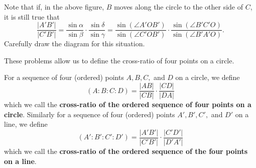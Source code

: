 \documentclass[newpage,hints,handout]{ximera}
\begin{document}



\begin{problem}
Note that if, in the above figure, $B$ moves along the
circle to the other side of $C$, it is still true that%
\[
\frac{\left|A'B'\right|}{\left|C'B'\right|}=
\frac{\sin\alpha}{\sin\beta}\cdot\frac{\sin\delta}{\sin\gamma}=
\frac{\sin\left(\angle A'OB'\right)}{\sin\left(\angle C'OB'\right)}\cdot\frac{
\sin\left( \angle B'C'O\right)}{\sin\left(\angle B'A'O\right)}.
\]
Carefully draw the diagram for this situation.
\end{problem}

These problems allow us to define the cross-ratio of four points on a
circle.

\begin{definition}
For a sequence of four (ordered) points $A,B,C,$ and $D$ on a circle,
we define%
\[
\left(A:B:C:D\right)=
\frac{\left| AB\right|}{\left|CB\right|}\cdot
\frac{
\left|CD\right|
}{
\left|DA\right|
}%
\]
which we call the \textbf{cross-ratio of the ordered sequence of four
  points on a circle}.  Similarly for a sequence of four (ordered) points
$A',B',C',$ and $D'$ on a line, we define%
\[
\left(  A':B':C':D'\right)  =
\frac{\left| A'B'\right| }{\left| C'B'\right|
}\cdot
\frac{
\left|C'D'\right|
}{
\left|D'A'\right|
}
\]
which we call the \textbf{cross-ratio of the ordered sequence of the
  four points on a line}.
\end{definition}
\end{document}
